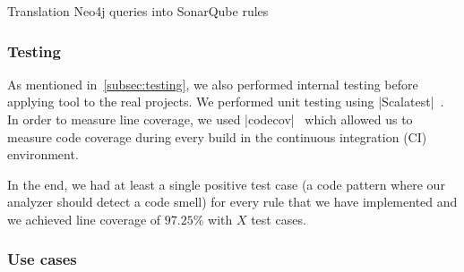 \begin{algorithm}
    \label{translation_algorithm}
    \caption{Translation Neo4j queries into SonarQube rules}
    \BlankLine

\end{algorithm}

\subsubsection{Testing}



As mentioned in~\ref{subsec:testing}, we also performed internal testing before applying tool to the real projects.
We performed unit testing using \verbatim|Scalatest|~\cite{scalatest}.
In order to measure line coverage, we used \verbatim|codecov|~\cite{codecov} which allowed us to measure
code coverage during every build in the continuous integration (CI) environment.

In the end, we had at least a single positive test case (a code pattern where our analyzer should detect a code smell)
for every rule that we have implemented and we achieved line coverage of $97.25\%$ with $X$ test cases.

\subsubsection{Use cases}


